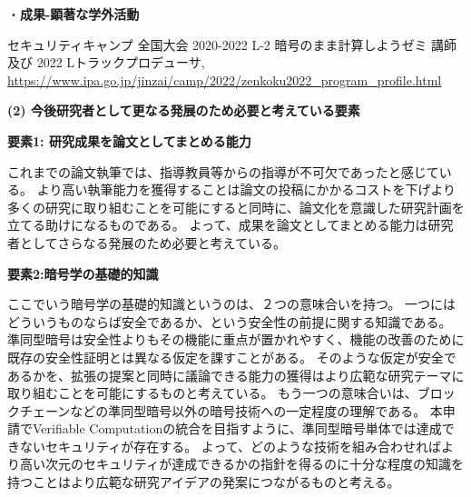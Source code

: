 \noindent・\textbf{成果-顕著な学外活動}

\begin{enumerate}[label={[\arabic*]},leftmargin=0.5cm]
    \setcounter{enumi}{12}
	\item セキュリティキャンプ 全国大会 2020-2022 L-2 暗号のまま計算しようゼミ 講師 及び 2022 Lトラックプロデューサ, \url{https://www.ipa.go.jp/jinzai/camp/2022/zenkoku2022_program_profile.html}\label{achieve:seccamp}
\end{enumerate}

\vspace{5mm}
\noindent\textbf{(2) 今後研究者として更なる発展のため必要と考えている要素}



\noindent\textbf{要素1: 研究成果を論文としてまとめる能力}

これまでの論文執筆では、指導教員等からの指導が不可欠であったと感じている。
より高い執筆能力を獲得することは論文の投稿にかかるコストを下げより多くの研究に取り組むことを可能にすると同時に、論文化を意識した研究計画を立てる助けになるものである。
よって、成果を論文としてまとめる能力は研究者としてさらなる発展のため必要と考えている。

\noindent\textbf{要素2:暗号学の基礎的知識}

ここでいう暗号学の基礎的知識というのは、２つの意味合いを持つ。
一つにはどういうものならば安全であるか、という安全性の前提に関する知識である。
準同型暗号は安全性よりもその機能に重点が置かれやすく、機能の改善のために既存の安全性証明とは異なる仮定を課すことがある。
そのような仮定が安全であるかを、拡張の提案と同時に議論できる能力の獲得はより広範な研究テーマに取り組むことを可能にするものと考えている。
もう一つの意味合いは、ブロックチェーンなどの準同型暗号以外の暗号技術への一定程度の理解である。
本申請でVerifiable Computationの統合を目指すように、準同型暗号単体では達成できないセキュリティが存在する。
よって、どのような技術を組み合わせればより高い次元のセキュリティが達成できるかの指針を得るのに十分な程度の知識を持つことはより広範な研究アイデアの発案につながるものと考える。




